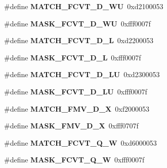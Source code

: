 \begin{DoxyCompactItemize}
\mbox{\label{riscv-utility_8h_ae01511be9cf581c865b179f4b82ccf71}} 
\#define {\bfseries M\+A\+T\+C\+H\+\_\+\+F\+C\+V\+T\+\_\+\+D\+\_\+\+WU}~0xd2100053
\item 
\mbox{\label{riscv-utility_8h_a16b15ea79dc0596012da96444ca74524}} 
\#define {\bfseries M\+A\+S\+K\+\_\+\+F\+C\+V\+T\+\_\+\+D\+\_\+\+WU}~0xfff0007f
\item 
\mbox{\label{riscv-utility_8h_a20ea97cb78a318d27d2def185979b286}} 
\#define {\bfseries M\+A\+T\+C\+H\+\_\+\+F\+C\+V\+T\+\_\+\+D\+\_\+L}~0xd2200053
\item 
\mbox{\label{riscv-utility_8h_a285d69424e59f9b1f1802e3ae0b776cb}} 
\#define {\bfseries M\+A\+S\+K\+\_\+\+F\+C\+V\+T\+\_\+\+D\+\_\+L}~0xfff0007f
\item 
\mbox{\label{riscv-utility_8h_a2e29767fee02674808f0de3fcd9cb160}} 
\#define {\bfseries M\+A\+T\+C\+H\+\_\+\+F\+C\+V\+T\+\_\+\+D\+\_\+\+LU}~0xd2300053
\item 
\mbox{\label{riscv-utility_8h_a18d2df6224cfeafdf27e524c5eab320d}} 
\#define {\bfseries M\+A\+S\+K\+\_\+\+F\+C\+V\+T\+\_\+\+D\+\_\+\+LU}~0xfff0007f
\item 
\mbox{\label{riscv-utility_8h_a51089ed075f34168b232a5679497d7e5}} 
\#define {\bfseries M\+A\+T\+C\+H\+\_\+\+F\+M\+V\+\_\+\+D\+\_\+X}~0xf2000053
\item 
\mbox{\label{riscv-utility_8h_a29d307f4e7a4f547e4792313c3513ced}} 
\#define {\bfseries M\+A\+S\+K\+\_\+\+F\+M\+V\+\_\+\+D\+\_\+X}~0xfff0707f
\item 
\mbox{\label{riscv-utility_8h_a34700cb4c6e0c6c9a14c1c18e5a73d3a}} 
\#define {\bfseries M\+A\+T\+C\+H\+\_\+\+F\+C\+V\+T\+\_\+\+Q\+\_\+W}~0xd6000053
\item 
\mbox{\label{riscv-utility_8h_a388afbd6cd018e5e85c5113ef77f45ee}} 
\#define {\bfseries M\+A\+S\+K\+\_\+\+F\+C\+V\+T\+\_\+\+Q\+\_\+W}~0xfff0007f
\item 
\mbox{\label{riscv-utility_8h_a6bc3d8f29532bf9c5c5ed1cf14d8ce12}} 

\end{DoxyCompactItemize}
